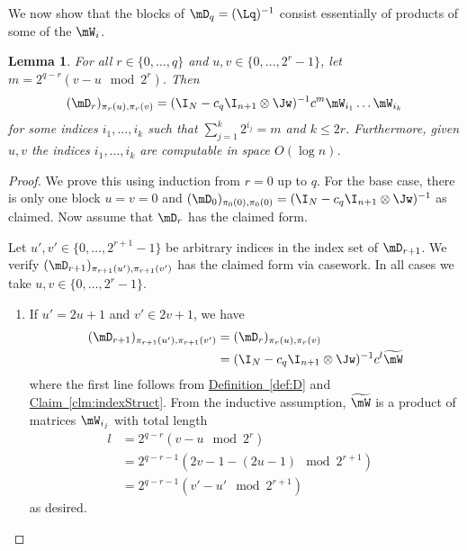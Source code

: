 \documentclass[11pt]{article}
\newcommand{\expref}[2]{\texorpdfstring{\hyperref[#2]{#1~\ref{#2}}}{#1~\ref{#2}}}
\newtheorem{lemma}[theorem]{Lemma}
\begin{document}
We now show that the blocks of $\mD_q=(\Lq)^{-1}$ consist essentially of products of
%
some of the $\mW_i$.  %
\begin{lemma}\label{lem:labelstruct}
For all $r \in \{0,\ldots,q\}$ and $u,v\in \{0,\ldots,2^{r}-1\}$, let $m=2^{q-r}(v-u \mod 2^{r})$. Then
$$(\mD_r)_{\pi_{r}(u),\pi_{r}(v)}=(\I_N-c_q\I_{n+1}\otimes\Jw)^{-1}c^{m}\mW_{i_1}\dots \mW_{i_k}$$
for some indices $i_1,\dots,i_k$ such that $\sum_{j=1}^k 2^{i_j}=m$ and $k\leq 2r$. Furthermore, given $u,v$ the indices $i_1,\ldots,i_k$ are computable in space $O(\log n)$.
\end{lemma}
\begin{proof}
We prove this using induction from $r=0$ up to $q$. For the base case, there is only one block $u=v=0$ and $(\mD_{0})_{\pi_0(0),\pi_0(0)}=(\I_N-c_q\I_{n+1}\otimes\Jw)^{-1}$ as claimed.
Now assume that $\mD_{r}$ has the claimed form.

Let $u',v'\in \{0,\ldots,2^{r+1}-1\}$ be arbitrary indices in the index set of $\mD_{r+1}$. We verify $(\mD_{r+1})_{\pi_{r+1}(u'),\pi_{r+1}(v')}$ has the claimed form via casework. In all cases we take $u,v\in \{0,\ldots,2^r-1\}$.

\begin{enumerate}
    \item If $u'=2u+1$ and $v'\in 2v+1$, we have
    \begin{align*}
        (\mD_{r+1})_{\pi_{r+1}(u'),\pi_{r+1}(v')} &= (\mD_{r})_{\pi_r(u),\pi_r(v)}\\
        &= (\I_N-c_q\I_{n+1}\otimes\Jw)^{-1}c^{l}\widetilde{\mW}
    \end{align*}
    where the first line follows from \expref{Definition}{def:D} and \expref{Claim}{clm:indexStruct}. From the inductive assumption, $\widetilde{\mW}$ is a product of matrices $\mW_{i_j}$ with total length
    \begin{align*}
        l &=2^{q-r}(v-u \mod 2^{r})&\\
        &=2^{q-r-1}(2v-1-(2u-1) \mod 2^{r+1})\\
        &=2^{q-r-1}(v'-u' \mod 2^{r+1})
    \end{align*} 
    as desired.
    

\end{enumerate}
\end{proof}
\end{document}
